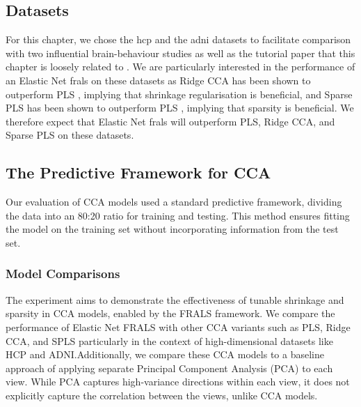 \subsection{Datasets}\label{subsec:datasets}

For this chapter, we chose the \acrshort{hcp} and the \acrshort{adni} datasets to facilitate comparison with two influential brain-behaviour studies \citep{smith2015positive, monteiro2016multiple} as well as the tutorial paper that this chapter is loosely related to \citep{mihalik2022canonical}.
We are particularly interested in the performance of an Elastic Net \acrshort{frals} on these datasets as Ridge CCA has been shown to outperform PLS \citep{mihalik2022canonical}, implying that shrinkage regularisation is beneficial, and Sparse PLS has been shown to outperform PLS \citep{monteiro2016multiple}, implying that sparsity is beneficial. 
We therefore expect that Elastic Net \acrshort{frals} will outperform PLS, Ridge CCA, and Sparse PLS on these datasets.

\subsection{The Predictive Framework for CCA}\label{subsec:the-predictive-framework-for-cca}

Our evaluation of CCA models used a standard predictive framework, dividing the data into an 80:20 ratio for training and testing. This method ensures fitting the model on the training set without incorporating information from the test set.

\subsubsection{Model Comparisons}

The experiment aims to demonstrate the effectiveness of tunable shrinkage and sparsity in CCA models, enabled by the FRALS framework.
We compare the performance of Elastic Net FRALS with other CCA variants such as PLS, Ridge CCA, and SPLS particularly in the context of high-dimensional datasets like HCP and ADNI\@.Additionally, we compare these CCA models to a baseline approach of applying separate Principal Component Analysis (PCA) to each view. While PCA captures high-variance directions within each view, it does not explicitly capture the correlation between the views, unlike CCA models.

